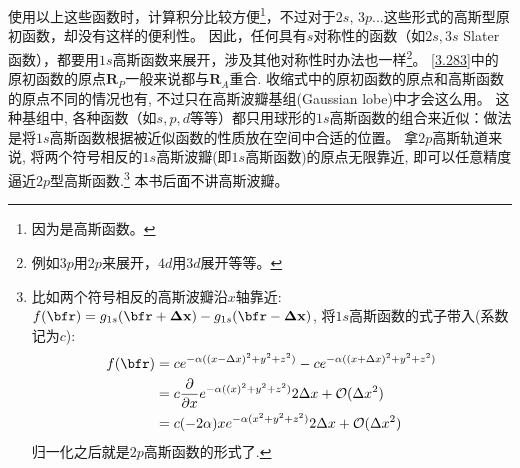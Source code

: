 使用以上这些函数时，计算积分比较方便\footnote{因为是高斯函数。}，不过对于$2s$, $3p$...这些形式的高斯型原初函数，却没有这样的便利性。
因此，任何具有$s$对称性的函数（如$2s,3s$ Slater函数），都要用$1s$高斯函数来展开，涉及其他对称性时办法也一样\footnote{例如$3p$用$2p$来展开，$4d$用$3d$展开等等。}。
\autoref{3.283}中的原初函数的原点$\mathbf{R}_P$一般来说都与$\mathbf{R}_A$重合. 
收缩式中的原初函数的原点和高斯函数的原点不同的情况也有, 不过只在高斯波瓣基组(Gaussian lobe)中才会这么用。
这种基组中, 各种函数（如$s,p,d$等等）都只用球形的$1s$高斯函数的组合来近似：做法是将$1s$高斯函数根据被近似函数的性质放在空间中合适的位置。
拿$2p$高斯轨道来说, 将两个符号相反的$1s$高斯波瓣(即$1s$高斯函数)的原点无限靠近, 即可以任意精度逼近$2p$型高斯函数.\footnote{
	比如两个符号相反的高斯波瓣沿$x$轴靠近: $f(\bfr)=g_{1s}(\bfr+\mathbf{\Delta x})-g_{1s}(\bfr-\mathbf{\Delta x})$, 
	将$1s$高斯函数的式子带入(系数记为$c$):
	\begin{align*}
		f(\bfr) & = ce^{-\alpha((x-\Delta x)^2+y^2+z^2)}-
		ce^{-\alpha((x+\Delta x)^2+y^2+z^2)}\\
		& = c\frac{\partial}{\partial x}e^{-\alpha((x)^2+y^2+z^2)}2\Delta x +\mathcal{O}(\Delta x^2)\\
		& = c(-2\alpha) xe^{-\alpha(x^2+y^2+z^2)}2\Delta x +\mathcal{O}(\Delta x^2)
	\end{align*}
	归一化之后就是$2p$高斯函数的形式了.
}
本书后面不讲高斯波瓣。


